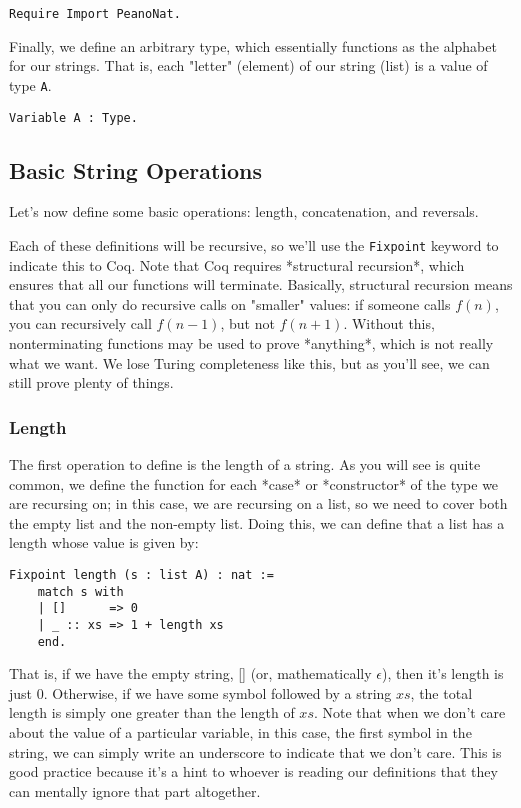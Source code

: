 \begin{verbatim}
Require Import PeanoNat.
\end{verbatim}

Finally, we define an arbitrary type, which essentially functions as the alphabet for our strings.
That is, each "letter" (element) of our string (list) is a value of type \texttt{A}.

\begin{verbatim}
Variable A : Type.
\end{verbatim}

\subsection{Basic String Operations}

Let's now define some basic operations: length, concatenation, and reversals.

Each of these definitions will be recursive, so we'll use the \texttt{Fixpoint} keyword to indicate this to Coq.
Note that Coq requires *structural recursion*, which ensures that all our functions will terminate.
Basically, structural recursion means that you can only do recursive calls on "smaller" values: if someone calls $f(n)$, you can recursively call $f(n-1)$, but not $f(n+1)$.
Without this, nonterminating functions may be used to prove *anything*, which is not really what we want.
We lose Turing completeness like this, but as you'll see, we can still prove plenty of things.

\subsubsection{Length}

The first operation to define is the length of a string.
As you will see is quite common, we define the function for each *case* or *constructor* of the type we are recursing on; in this case, we are recursing on a list, so we need to cover both the empty list and the non-empty list.
Doing this, we can define that a list has a length whose value is given by:

\begin{verbatim}
Fixpoint length (s : list A) : nat :=
    match s with
    | []      => 0
    | _ :: xs => 1 + length xs
    end.
\end{verbatim}

That is, if we have the empty string, [] (or, mathematically $\epsilon$), then it's length is just 0.
Otherwise, if we have some symbol followed by a string $xs$, the total length is simply one greater than the length of $xs$.
Note that when we don't care about the value of a particular variable, in this case, the first symbol in the string, we can simply write an underscore to indicate that we don't care.
This is good practice because it's a hint to whoever is reading our definitions that they can mentally ignore that part altogether.

